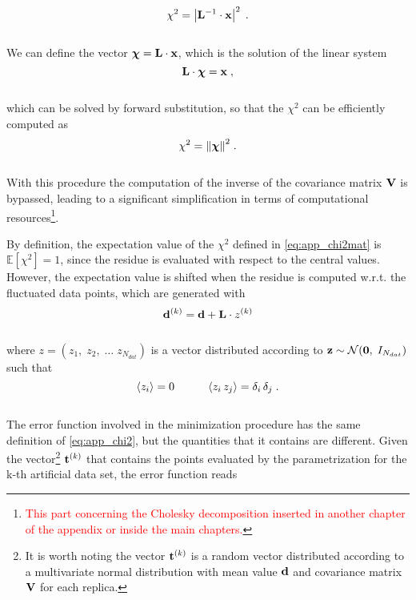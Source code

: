 \\
\begin{equation}
    \chi^2 = \left| \mathbf{L}^{-1} \cdot \mathbf{x} \right|^2 \; .
\end{equation}
\\
We can define the vector $\boldsymbol{\chi} = \mathbf{L} \cdot \mathbf{x}$, which is the solution of the linear system
\\
\begin{equation}
    \mathbf{L} \cdot \boldsymbol{\chi} = \mathbf{x} \; ,
\end{equation}
\\
which can be solved by forward substitution, so that the $\chi^2$ can be efficiently computed as
\\
\begin{equation}
    \chi^2 = \norm{\boldsymbol{\chi}}^2 \; . 
\end{equation}
\\
With this procedure the computation of the inverse of the covariance matrix $\mathbf{V}$ is bypassed, leading to a significant simplification in terms of computational resources\footnote{\footnotesize{\textcolor{red}{This part concerning the Cholesky decomposition inserted in another chapter of the appendix or inside the main chapters.}}}.\par
By definition, the expectation value of the $\chi^2$ defined in \eqref{eq:app_chi2mat} is $\mathbb{E}[\chi^2] = 1$, since the residue is evaluated with respect to the central values. However, the expectation value is shifted when the residue is computed w.r.t. the fluctuated data points, which are generated with 
\\
\begin{equation}
    \mathbf{d}^{(k)} = \mathbf{d} + \mathbf{L} \cdot z^{(k)} 
\end{equation}
\\
where $z = (z_1, \; z_2, \; \dots \; z_{N_{dat}})$ is a vector distributed according to $\mathbf{z} \sim \mathcal{N}(\mathbf{0},\; I_{N_{dat}})$ such that
\\
\begin{equation}
    \left< z_i \right> = 0 \hspace{10mm} \left< z_i \, z_j \right> = \delta_i \, \delta_j \;.
\end{equation}
\\
The error function involved in the minimization procedure has the same definition of \eqref{eq:app_chi2}, but the quantities that it contains are different. Given the vector\footnote{\footnotesize{It is worth noting the vector $\mathbf{t}^{(k)}$ is a random vector distributed according to a multivariate normal distribution with mean value $\mathbf{d}$ and covariance matrix $\mathbf{V}$ for each replica.}} $\mathbf{t}^{(k)}$ that contains the points evaluated by the parametrization for the k-th artificial data set, the error function reads
